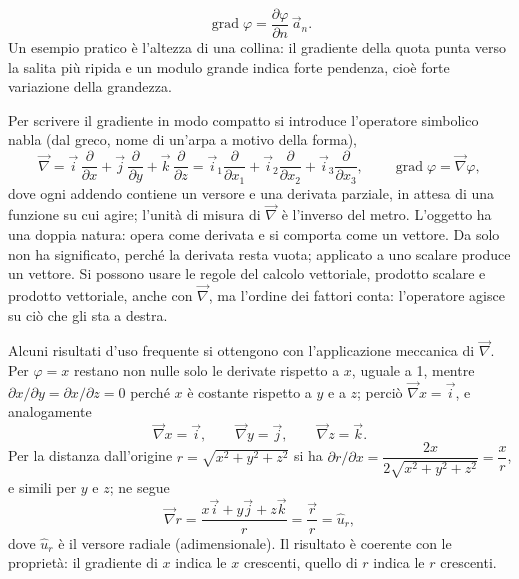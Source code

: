 \documentclass[11pt,a4paper]{article}
\newcommand{\nab}{\vec{\nabla}}
\DeclareMathOperator{\grad}{grad}
\begin{document}
\[
\grad\varphi=\frac{\partial\varphi}{\partial n}\,\vec a_n .
\]
Un esempio pratico è l'altezza di una collina: il gradiente della quota punta verso la salita più ripida e un modulo grande indica forte pendenza, cioè forte variazione della grandezza.

Per scrivere il gradiente in modo compatto si introduce l'operatore simbolico nabla (dal greco, nome di un'arpa a motivo della forma),
\[
\nab=\vec i\,\frac{\partial}{\partial x}+\vec j\,\frac{\partial}{\partial y}+\vec k\,\frac{\partial}{\partial z}=\vec i_1\frac{\partial}{\partial x_1}+\vec i_2\frac{\partial}{\partial x_2}+\vec i_3\frac{\partial}{\partial x_3},\qquad \grad\varphi=\nab\varphi ,
\]
dove ogni addendo contiene un versore e una derivata parziale, in attesa di una funzione su cui agire; l'unità di misura di $\nab$ è l'inverso del metro. L'oggetto ha una doppia natura: opera come derivata e si comporta come un vettore. Da solo non ha significato, perché la derivata resta vuota; applicato a uno scalare produce un vettore. Si possono usare le regole del calcolo vettoriale, prodotto scalare e prodotto vettoriale, anche con $\nab$, ma l'ordine dei fattori conta: l'operatore agisce su ciò che gli sta a destra.

Alcuni risultati d'uso frequente si ottengono con l'applicazione meccanica di $\nab$. Per $\varphi=x$ restano non nulle solo le derivate rispetto a $x$, uguale a 1, mentre $\partial x/\partial y=\partial x/\partial z=0$ perché $x$ è costante rispetto a $y$ e a $z$; perciò $\nab x=\vec i$, e analogamente
\[
\nab x=\vec i,\qquad\nab y=\vec j,\qquad\nab z=\vec k .
\]
Per la distanza dall'origine $r=\sqrt{x^2+y^2+z^2}$ si ha $\partial r/\partial x=\dfrac{2x}{2\sqrt{x^2+y^2+z^2}}=\dfrac xr$, e simili per $y$ e $z$; ne segue
\[
\nab r=\frac{x\vec i+y\vec j+z\vec k}{r}=\frac{\vec r}{r}=\hat u_r ,
\]
dove $\hat u_r$ è il versore radiale (adimensionale). Il risultato è coerente con le proprietà: il gradiente di $x$ indica le $x$ crescenti, quello di $r$ indica le $r$ crescenti.
\end{document}
